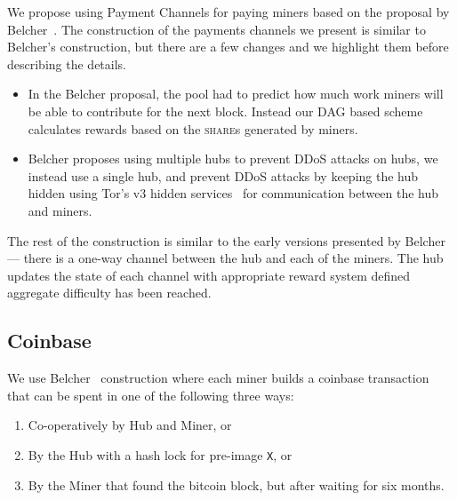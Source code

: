 \documentclass{article}
\begin{document}
We propose using Payment Channels for paying miners based on the
proposal by Belcher~\cite{channels-for-rewards}. The construction of
the payments channels we present is similar to Belcher's construction,
but there are a few changes and we highlight them before describing
the details.

\begin{itemize}
\item In the Belcher proposal, the pool had to predict how much work
  miners will be able to contribute for the next block. Instead our
  DAG based scheme calculates rewards based on the \textsc{share}s
  generated by miners.
\item Belcher proposes using multiple hubs to prevent DDoS attacks on
  hubs, we instead use a single hub, and prevent DDoS attacks by
  keeping the hub hidden using Tor's v3 hidden
  services~\cite{tor-design} for communication between the hub and
  miners.
\end{itemize}

The rest of the construction is similar to the early versions
presented by Belcher --- there is a one-way channel between the hub
and each of the miners. The hub updates the state of each channel with
appropriate reward system defined aggregate difficulty has been
reached.



\subsection{Coinbase}

We use Belcher~\cite{channels-for-rewards} construction where each
miner builds a coinbase transaction that can be spent in one of the
following three ways:

\begin{enumerate}
\item Co-operatively by Hub and Miner, or
\item By the Hub with a hash lock for pre-image \verb|X|, or
\item By the Miner that found the bitcoin block, but after waiting for
  six months.
\end{enumerate}
\end{document}
